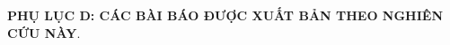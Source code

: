 \clearpage
\section*{}

\vspace*{\fill}
\begin{center}
    \Large \textbf{PHỤ LỤC D: CÁC BÀI BÁO ĐƯỢC XUẤT BẢN THEO NGHIÊN CỨU NÀY}.
\end{center}
\vspace*{\fill}

%
%